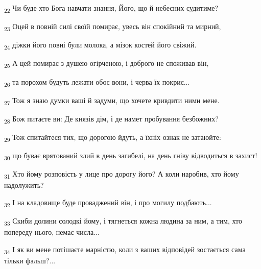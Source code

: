 \begin{tcolorbox}
\textsubscript{22} Чи буде хто Бога навчати знання, Його, що й небесних судитиме?
\end{tcolorbox}
\begin{tcolorbox}
\textsubscript{23} Оцей в повній силі своїй помирає, увесь він спокійний та мирний,
\end{tcolorbox}
\begin{tcolorbox}
\textsubscript{24} діжки його повні були молока, а мізок костей його свіжий.
\end{tcolorbox}
\begin{tcolorbox}
\textsubscript{25} А цей помирає з душею огірченою, і доброго не споживав він,
\end{tcolorbox}
\begin{tcolorbox}
\textsubscript{26} та порохом будуть лежати обоє вони, і черва їх покриє...
\end{tcolorbox}
\begin{tcolorbox}
\textsubscript{27} Тож я знаю думки ваші й задуми, що хочете кривдити ними мене.
\end{tcolorbox}
\begin{tcolorbox}
\textsubscript{28} Бож питаєте ви: Де князів дім, і де намет пробування безбожних?
\end{tcolorbox}
\begin{tcolorbox}
\textsubscript{29} Тож спитайтеся тих, що дорогою йдуть, а їхніх ознак не затаюйте:
\end{tcolorbox}
\begin{tcolorbox}
\textsubscript{30} що буває врятований злий в день загибелі, на день гніву відводиться в захист!
\end{tcolorbox}
\begin{tcolorbox}
\textsubscript{31} Хто йому розповість у лице про дорогу його? А коли наробив, хто йому надолужить?
\end{tcolorbox}
\begin{tcolorbox}
\textsubscript{32} І на кладовище буде проваджений він, і про могилу подбають...
\end{tcolorbox}
\begin{tcolorbox}
\textsubscript{33} Скиби долини солодкі йому, і тягнеться кожна людина за ним, а тим, хто попереду нього, немає числа...
\end{tcolorbox}
\begin{tcolorbox}
\textsubscript{34} І як ви мене потішаєте марністю, коли з ваших відповідей зостається сама тільки фальш?...
\end{tcolorbox}
